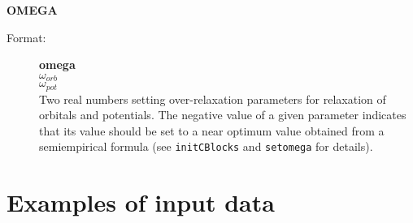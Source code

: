 \documentclass[12pt,a4paper]{article}
\newcommand{\ft}[1]{\texttt{#1}}
\begin{document}
\begin{description}
\item \textbf{OMEGA}
\begin{description} 
\item[Format:] \textbf{omega} \\
\hspace*{0.9cm}$\omega_{orb}$ \\ 
\hspace*{0.9cm}$\omega_{pot}$ \\ Two real numbers setting over-relaxation
parameters for relaxation of orbitals and potentials. 
The negative value of a given
parameter indicates that its value should be set to a near optimum value obtained from a
semiempirical formula (see \ft{initCBlocks} and \ft{setomega} for details). 
\end{description}

\end{description}


\newpage

\section{Examples of input data}
\end{document}
